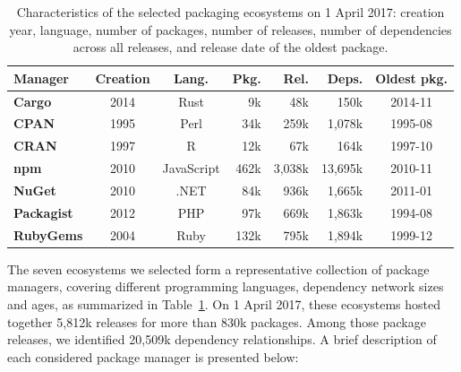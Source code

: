 \documentclass[smallextended]{svjour3}       %
\newcommand{\cran}{\textsf{CRAN}\xspace}
\newcommand{\cpan}{\textsf{CPAN}\xspace}
\newcommand{\rubygems}{\textsf{RubyGems}\xspace}
\newcommand{\packagist}{\textsf{Packagist}\xspace}
\newcommand{\cargo}{\textsf{Cargo}\xspace}
\newcommand{\nuget}{\textsf{NuGet}\xspace}
\newcommand{\npm}{\textsf{npm}\xspace}
\newcommand{\javascript}{\textsf{JavaScript}\xspace}
\newcommand{\ruby}{\textsf{Ruby}\xspace}
\newcommand{\R}{\textsf{R}\xspace}
\newcommand{\perl}{\textsf{Perl}\xspace}
\newcommand{\php}{\textsf{PHP}\xspace}
\newcommand{\rust}{\textsf{Rust}\xspace}
\newcommand{\dotnet}{\textsf{.NET}\xspace}
\begin{document}
\begin{table}[!htbp]
\caption{Characteristics of the selected packaging ecosystems on 1 April 2017: creation year, language, number of packages, number of releases, number of dependencies across all releases, and release date of the oldest package.}
\label{tab:characteristics}\centering
\begin{tabular}{l||c|c|r|r|r|c}
  \bf Manager & \bf Creation & \bf Lang. & \bf Pkg. & \bf Rel. & \bf Deps. & \bf Oldest pkg.\\ \hline
  \bf \cargo & 2014 & \rust & 9k & 48k & 150k & 2014-11 \\
  \bf \cpan & 1995 & \perl & 34k & 259k & 1,078k & 1995-08 \\
  \bf \cran & 1997 & \R & 12k & 67k & 164k & 1997-10 \\
  \bf \npm & 2010 & \javascript & 462k & 3,038k & 13,695k & 2010-11 \\
  \bf \nuget & 2010 & \dotnet & 84k & 936k & 1,665k & 2011-01 \\
  \bf \packagist & 2012 & \php & 97k & 669k & 1,863k & 1994-08 \\
  \bf \rubygems & 2004 & \ruby & 132k & 795k & 1,894k & 1999-12 %
\end{tabular}
\end{table}

The seven ecosystems we selected form a representative collection of package managers, covering different programming languages, dependency network sizes and ages, as summarized in Table~\ref{tab:characteristics}.
On 1 April 2017, these ecosystems hosted together 5,812k releases for more than 830k packages. Among those package releases, we identified 20,509k dependency relationships.
A brief description of each considered package manager is presented below:
\end{document}
